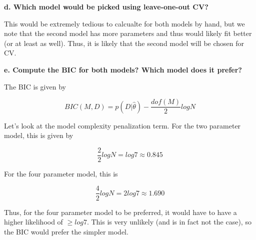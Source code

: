 {\textbf{d. Which model would be picked using leave-one-out CV?}

This would be extremely tedious to calcualte for both models by hand, but we
note that the second model has more parameters and thus would likely fit better
(or at least as well). Thus, it is likely that the second model will be chosen
for CV.

\textbf{e. Compute the BIC for both models? Which model does it prefer?}

The BIC is given by

$$BIC(M, D) = p(D|\hat{\theta}) - \frac{dof(M)}{2}log N$$

Let's look at the model complexity penalization term. For the two parameter
model, this is given by

$$\frac{2}{2}log N = log 7 \approx 0.845$$

For the four parameter model, this is

$$\frac{4}{2}log N = 2log 7 \approx 1.690$$

Thus, for the four parameter model to be preferred, it would have to have
a higher likelihood of $\geq log 7$. This is very unlikely (and is in fact
not the case), so the BIC would prefer the simpler model.

}


